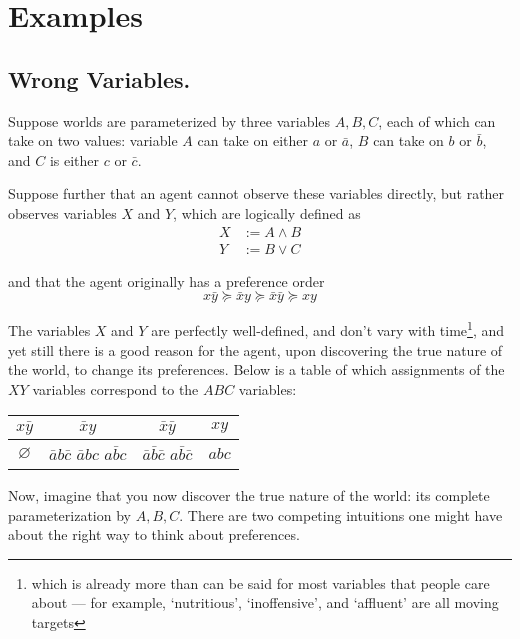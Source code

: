 \documentclass{book}
\newcommand\geqc{\succcurlyeq}
\begin{document}
	\chapter{Examples}
	
	\section{Wrong Variables.}
	Suppose worlds are parameterized by three variables $A, B, C$, each of which can take on two values: variable $A$ can take on either $a$ or $\bar a$, $B$ can take on $b$ or $\bar b$, and $C$ is either $c$ or $\bar c$.
	
	Suppose further that an agent cannot observe these variables directly, but rather observes variables $X$ and $Y$, which are logically defined as 
	\begin{align*}
		X &:= A \land B \\
		Y &:= B \lor C
	\end{align*}
	
	and that the agent originally has a preference order
	\[ x \bar y \geqc \bar x y \geqc \bar x \bar y \geqc x y  \]
	
	The variables $X$ and $Y$ are perfectly well-defined, and don't vary with time\footnote{which is already more than can be said for most variables that people care about --- for example, `nutritious', `inoffensive', and `affluent' are all moving targets}, and yet still there is a good reason for the agent, upon discovering the true nature of the world, to change its preferences. Below is a table of which assignments of the $XY$ variables correspond to the $ABC$ variables:
	
	
	
	\begin{center}
		\begin{tabular}{cccc}
			$x \bar y $ & $\bar x y$ & $\bar x \bar y$ & $x y$ \\\hline
			\rule{0pt}{2.3em}$\varnothing$ & \parbox[c]{0.5cm}{$\bar a b \bar c$\\$\bar a b c$ \\ $a \bar b c$} 
				& \parbox[c]{0.5cm}{$\bar a \bar b \bar c$ \\ $a \bar b \bar c$}
				& \parbox[c]{0.5cm}{$abc$} \\[1.3em]\hline
		\end{tabular}
	\end{center}
	\vspace{1em}
	
	
	Now, imagine that you now discover the true nature of the world: its complete parameterization by $A,B,C$. There are two competing intuitions one might have about the right way to think about preferences.
	
\end{document}
